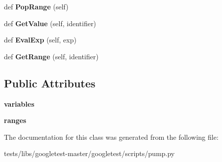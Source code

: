 \begin{DoxyCompactItemize}
\mbox{\label{classtests_1_1libs_1_1googletest-master_1_1googletest_1_1scripts_1_1pump_1_1Env_a9070c7c86fbe0d62d3c79aac38fbafc3}} 
def {\bfseries Pop\+Range} (self)
\item 
\mbox{\label{classtests_1_1libs_1_1googletest-master_1_1googletest_1_1scripts_1_1pump_1_1Env_a9cde8dd2996defae7b8f8760add3b17d}} 
def {\bfseries Get\+Value} (self, identifier)
\item 
\mbox{\label{classtests_1_1libs_1_1googletest-master_1_1googletest_1_1scripts_1_1pump_1_1Env_a0723ba8ea40b8ca17cd6d8ef417aea9c}} 
def {\bfseries Eval\+Exp} (self, exp)
\item 
\mbox{\label{classtests_1_1libs_1_1googletest-master_1_1googletest_1_1scripts_1_1pump_1_1Env_ab8ebf926efb1b218bcbaae442bde6f25}} 
def {\bfseries Get\+Range} (self, identifier)
\end{DoxyCompactItemize}
\subsection*{Public Attributes}
\begin{DoxyCompactItemize}
\item 
\mbox{\label{classtests_1_1libs_1_1googletest-master_1_1googletest_1_1scripts_1_1pump_1_1Env_a6f8f8ce05abed1e293dc3f8fd09b8f71}} 
{\bfseries variables}
\item 
\mbox{\label{classtests_1_1libs_1_1googletest-master_1_1googletest_1_1scripts_1_1pump_1_1Env_aa3e65b23df5a170e455a5da8565a5924}} 
{\bfseries ranges}
\end{DoxyCompactItemize}


The documentation for this class was generated from the following file\+:\begin{DoxyCompactItemize}
\item 
tests/libs/googletest-\/master/googletest/scripts/pump.\+py\end{DoxyCompactItemize}
